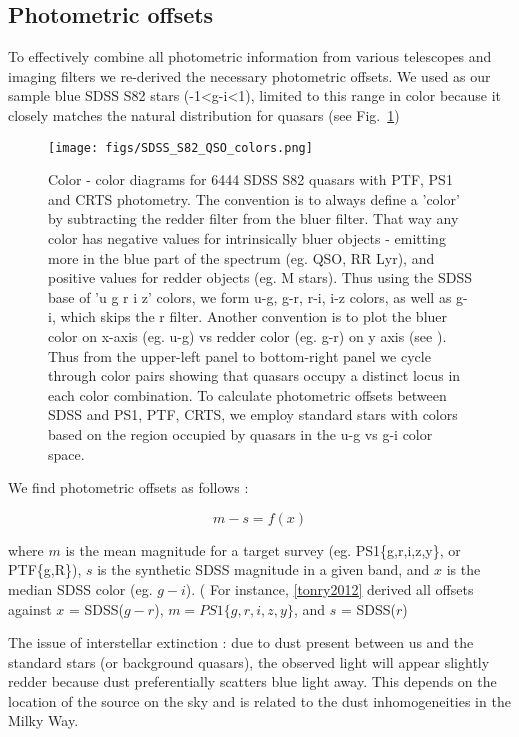 \documentclass[fleqn,usenatbib]{mnras}  %
\begin{document}
\subsection{Photometric offsets}

To effectively combine all photometric information from various telescopes and imaging filters we re-derived the necessary photometric offsets. We used as our sample blue SDSS S82 stars (-1<g-i<1), limited to this range in color because it closely matches the natural distribution for quasars (see Fig.~\ref{fig:quasar_colors})


\begin{figure}
\texttt{[image: figs/SDSS\_S82\_QSO\_colors.png]}
\caption{Color - color diagrams for 6444 SDSS S82 quasars with PTF, PS1 and CRTS photometry. The convention is to always define a 'color' by subtracting the redder filter from the bluer filter. That way any color has negative values for intrinsically bluer objects - emitting more in the blue part of the spectrum (eg. QSO, RR Lyr), and positive values for redder objects (eg. M stars). Thus using the SDSS base of 'u g r i z' colors,  we form u-g, g-r,  r-i, i-z  colors, as well as g-i, which skips the r filter. Another convention is to plot the bluer color on x-axis (eg. u-g) vs redder color (eg. g-r) on y axis (see \citealt{ivezic2002,sesar2007}). Thus from the upper-left panel to bottom-right panel we cycle through color pairs showing that quasars occupy a distinct locus in each color combination. To calculate photometric offsets between SDSS and PS1, PTF, CRTS, we employ standard stars with colors based on the region occupied by quasars in the u-g vs g-i color space. }
\label{fig:quasar_colors}
\end{figure} 



We find photometric offsets as follows : 

\begin{equation}
m - s = f(x)
\end{equation}

where $m$ is the mean magnitude for a target survey (eg. PS1\{g,r,i,z,y\}, or PTF\{g,R\}),  $s$ is the synthetic SDSS magnitude in a given band, and $x$ is the median SDSS color (eg. $g-i$).   ( For instance, \ref{tonry2012} derived all offsets against $x$ = SDSS($g-r$), $m = PS1 \{g,r,i,z,y\}$, and $s$ = SDSS($r$)



The issue of interstellar extinction : due to dust present between us and the standard stars (or background quasars), the observed light will appear slightly redder because dust preferentially scatters blue light away. This depends on the location of the source on the  sky and is related to the dust inhomogeneities in the Milky Way. 
\end{document}
